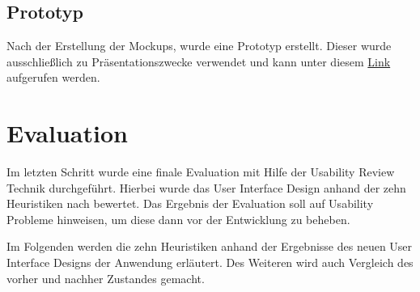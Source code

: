 \subsection{Prototyp}

Nach der Erstellung der Mockups, wurde eine Prototyp erstellt.
Dieser wurde ausschließlich zu Präsentationszwecke verwendet und kann unter diesem \href{https://figma.fun/71cjZX}{Link} aufgerufen werden.

\section{Evaluation}

Im letzten Schritt wurde eine finale Evaluation mit Hilfe der Usability Review Technik durchgeführt.
Hierbei wurde das User Interface Design anhand der zehn Heuristiken nach \citet{nielsen_usability_1993} bewertet.
Das Ergebnis der Evaluation soll auf Usability Probleme hinweisen, um diese dann vor der Entwicklung zu beheben.

Im Folgenden werden die zehn Heuristiken anhand der Ergebnisse des neuen User Interface Designs der Anwendung erläutert.
Des Weiteren wird auch Vergleich des vorher und nachher Zustandes gemacht.

